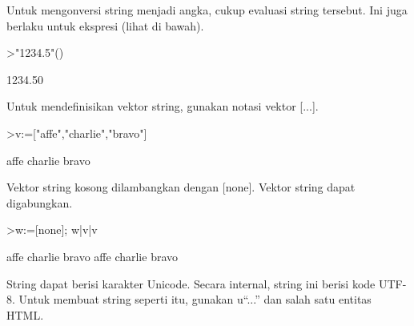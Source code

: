 \documentclass[a4paper,10pt]{article}
\begin{document}
\begin{eulernotebook}
\begin{eulercomment}
Untuk mengonversi string menjadi angka, cukup evaluasi string
tersebut. Ini juga berlaku untuk ekspresi (lihat di bawah).
\end{eulercomment}
\begin{eulerprompt}
>"1234.5"()
\end{eulerprompt}
\begin{euleroutput}
      1234.50 
\end{euleroutput}
\begin{eulercomment}
Untuk mendefinisikan vektor string, gunakan notasi vektor [...].
\end{eulercomment}
\begin{eulerprompt}
>v:=["affe","charlie","bravo"]
\end{eulerprompt}
\begin{euleroutput}
  affe
  charlie
  bravo
\end{euleroutput}
\begin{eulercomment}
Vektor string kosong dilambangkan dengan [none]. Vektor string dapat
digabungkan.
\end{eulercomment}
\begin{eulerprompt}
>w:=[none]; w|v|v
\end{eulerprompt}
\begin{euleroutput}
  affe
  charlie
  bravo
  affe
  charlie
  bravo
\end{euleroutput}
\begin{eulercomment}
String dapat berisi karakter Unicode. Secara internal, string ini
berisi kode UTF-8. Untuk membuat string seperti itu, gunakan u“...”
dan salah satu entitas HTML.


\end{eulercomment}
\end{eulernotebook}
\end{document}
